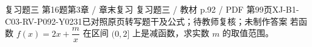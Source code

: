 \par\noindent\begin{minipage}{\linewidth}
\begin{bankitem}{复习题三 第16题}{第3章 / 章末复习 复习题三 / 教材 p.92 / PDF 第99页}{XJ-B1-C03-RV-P092-Y0231}{已对照原页转写题干及公式；待教师复核；未制作答案}
若函数 $f(x)=2x+\dfrac mx$ 在区间 $(0,2]$ 上是减函数，求实数 $m$ 的取值范围。
\end{bankitem}
\end{minipage}\par\medskip
